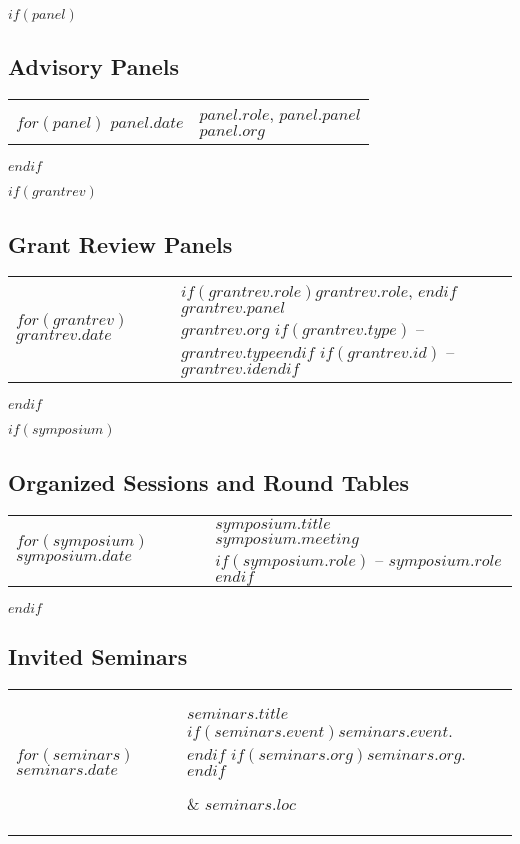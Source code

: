 \documentclass[martgin, line, 11pt]{article}
\begin{document}
$if(panel)$
\subsection*{Advisory Panels}
\setlength{\extrarowheight}{.75em}
\begin{tabular}{lp{5.5in}}   
$for(panel)$
$panel.date$&
\parbox[t]{5.5in}{$panel.role$, $panel.panel$\\
  \textit{$panel.org$}}\\
$endfor$
\end{tabular}
\setlength{\extrarowheight}{0em}
$endif$

$if(grantrev)$
\subsection*{Grant Review Panels}
\setlength{\extrarowheight}{.75em}
\begin{tabular}{lp{5.5in}}   
$for(grantrev)$
$grantrev.date$&
\parbox[t]{5.5in}{
  $if(grantrev.role)$$grantrev.role$, $endif$ 
  $grantrev.panel$\\
  \textit{$grantrev.org$}
  $if(grantrev.type)$ -- \textit{$grantrev.type$}$endif$
  $if(grantrev.id)$ -- \textit{$grantrev.id$}$endif$
  }\\
$endfor$
\end{tabular}
\setlength{\extrarowheight}{0em}
$endif$

$if(symposium)$
\subsection*{Organized Sessions and Round Tables}
\setlength{\extrarowheight}{.75em}
\begin{tabular}{lp{5.5in}}   
$for(symposium)$
$symposium.date$&
\parbox[t]{5.5in}{
    $symposium.title$\\
  \textit{$symposium.meeting$}
  $if(symposium.role)$ -- $symposium.role$$endif$ 
  }\\
$endfor$
\end{tabular}
\setlength{\extrarowheight}{0em}
$endif$

\subsection*{Invited Seminars}

\setlength{\extrarowheight}{.75em}
\begin{longtable}[l]{lp{3.75in}l}
  $for(seminars)$
  $seminars.date$&
  \parbox[t]{3.75in} { $seminars.title$\\
    \scriptsize{%
      $if(seminars.event)$\textit{$seminars.event$}. $endif$%
      $if(seminars.org)$$seminars.org$.$endif$%
    }} & $seminars.loc$\\
  $endfor$
\end{longtable}
\setlength{\extrarowheight}{0em}
\end{document}
